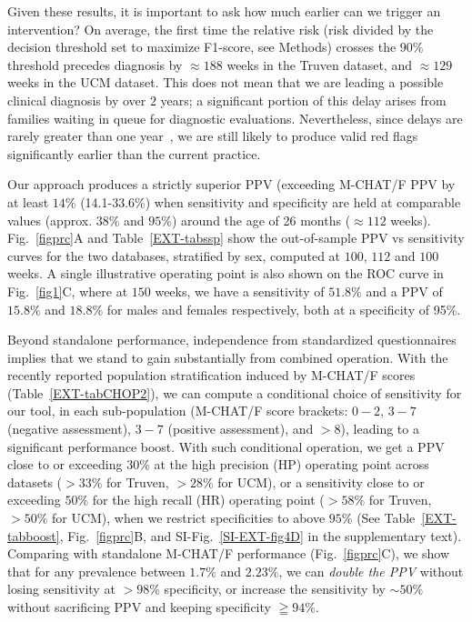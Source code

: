 \documentclass[3p,super,numbers,sort&compress,preprint,10pt]{elsarticle}
\begin{document}
Given these results, it is important to ask how much earlier can we trigger an intervention? On average,  the first time the relative risk (risk divided by the decision threshold set to maximize F1-score, see Methods) crosses the $90\%$ threshold precedes  diagnosis by  $\approx 188$ weeks in the Truven dataset, and $\approx 129$ weeks in the UCM dataset. This does not mean that we are   leading a possible clinical diagnosis by over $2$ years; a significant portion of this delay arises from families waiting in queue for diagnostic evaluations. Nevertheless, since delays are rarely greater than   one year~\cite{gordon2016whittling},  we are still likely to produce valid red flags significantly earlier than the current practice.%

Our approach produces a strictly superior PPV (exceeding M-CHAT/F PPV by at  least $14\%$ (14.1-33.6\%) when sensitivity and specificity are held at comparable values (approx. $38\%$ and $95\%$) around the age of 26 months ($\approx 112$ weeks). Fig.~\ref{figprc}A and Table~\ref{EXT-tabssp} show  the out-of-sample  PPV vs sensitivity curves   for the two databases, stratified by sex, computed at $100$, $112$ and $100$ weeks. A single illustrative operating point is also shown on the ROC curve in Fig.~\ref{fig1}C, where at $150$ weeks, we have a sensitivity of $51.8\%$ and a PPV of $15.8\%$ and $18.8\%$ for males and females respectively, both at a specificity of 95\%. 

Beyond standalone performance, independence from standardized questionnaires implies that we stand to gain substantially  from combined operation. With the recently reported population stratification induced by M-CHAT/F scores~\cite{pmid31562252} (Table~\ref{EXT-tabCHOP2}), we can compute a conditional choice of sensitivity  for our tool, in each sub-population (M-CHAT/F score brackets: $0-2$, $3-7$ (negative assessment), $3-7$ (positive assessment), and $>8$), leading to a  significant performance boost. With such conditional operation, we get a PPV close to or exceeding $30\%$ at the high precision (HP) operating point across datasets ($>33\%$ for Truven, $>28\%$ for UCM), or a sensitivity close to or exceeding $50\%$ for the high recall (HR) operating point ($>58\%$ for  Truven, $>50\%$ for UCM), when we restrict specificities to above $95\%$ (See Table~\ref{EXT-tabboost}, Fig.~\ref{figprc}B, and SI-Fig.~\ref{SI-EXT-fig4D}  in the supplementary text). Comparing   with standalone M-CHAT/F performance (Fig.~\ref{figprc}C), we show that for any prevalence between $1.7\%$ and $2.23\%$, we can   \textit{double the PPV} without losing sensitivity at $>98\%$ specificity, or increase the sensitivity by $\sim 50\%$ without sacrificing PPV and  keeping specificity $\geqq 94\%$.%
\end{document}
